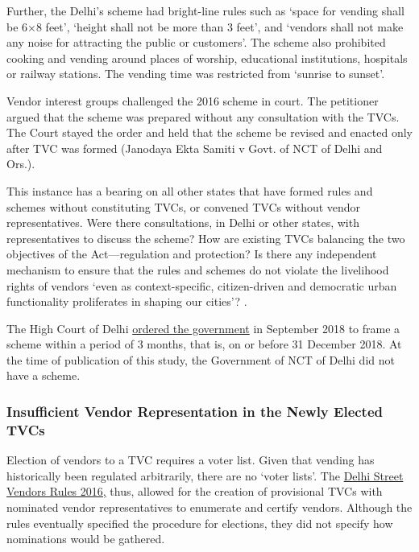 \documentclass[a4paper, 12pt, twoside]{article}
\begin{document}
{{Further, the Delhi’s scheme had bright-line rules such as `space for vending shall be 6×8 feet', `height shall not be more than 3 feet', and `vendors shall not make any noise for attracting the public or customers'. The scheme also prohibited cooking and vending around places of worship, educational institutions, hospitals or railway stations. The vending time was restricted from `sunrise to sunset'. 

Vendor interest groups challenged the 2016 scheme in court. The petitioner argued that the scheme was prepared without any consultation with the TVCs. The Court stayed the order and held that the scheme be revised and enacted only after TVC was formed (Janodaya Ekta Samiti v Govt. of NCT of Delhi and Ors.). 

This instance has a bearing on all other states that have formed rules and schemes without constituting TVCs, or convened TVCs without vendor representatives. Were there consultations, in Delhi or other states, with representatives to discuss the scheme? How are existing TVCs balancing the two objectives of the Act—regulation and protection? Is there any independent mechanism to ensure that the rules and schemes do not violate the livelihood rights of vendors `even as context-specific, citizen-driven and democratic urban functionality proliferates in shaping our cities'? \parencite{naikpaper}. 

The High Court of Delhi \href{https://indiankanoon.org/doc/107567214/}{ordered the government} in September 2018 to frame a scheme within a period of 3 months, that is, on or before 31 December 2018. At the time of publication of this study, the Government of NCT of Delhi did not have a scheme. 


\subsubsection*{Insufficient Vendor Representation in the Newly Elected TVCs}

Election of vendors to a TVC requires a voter list. Given that vending has historically been regulated arbitrarily, there are no `voter lists'. The \href{http://www.delhi.gov.in/wps/wcm/connect/c18e8c804b4db8f4bf5bff2b25f02d05/rules+and+schemes+for+street+612016.pdf?MOD=AJPERES\&lmod=1038658906\&CACHEID=c18e8c804b4db8f4bf5bff2b25f02d05}{Delhi Street Vendors Rules 2016,} thus, allowed for the creation of provisional TVCs with nominated vendor representatives to enumerate and certify vendors. Although the rules eventually specified the procedure for elections, they did not specify how nominations would be gathered.

}}
\end{document}
